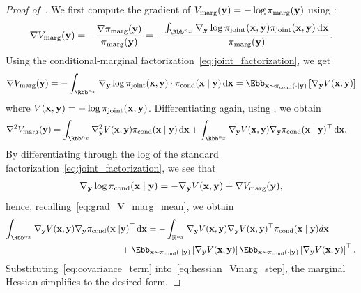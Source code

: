 \documentclass[onefignum,onetabnum]{siamonline250211}
\renewcommand{\d} {{\rm d}}                                %
\newcommand{\bfx}{{\bf x}}
\newcommand{\bfy}{{\bf y}}
\newcommand{\bbR}{\mathbb{R}}
\newcommand{\nx}{{n_{x}}}
\newcommand{\pjoint}{\pi_{\rm joint}}
\newcommand{\pcond}{\pi_{\rm cond}}
\newcommand{\pmarg}{\pi_{\rm marg}}
\begin{document}
\begin{proof}[Proof of~]
	We first compute the gradient of $V_{\rm marg}(\bfy) = -\log \pmarg(\bfy)$ using :
		\begin{align}
			\begin{split}
			\nabla V_{\rm marg}(\bfy)
				=-\frac{\nabla \pmarg(\bfy)}{\pmarg(\bfy)}
				= -\frac{\int_{\Rbb^\nx}  \nabla_{\bfy}\log \pjoint(\bfx, \bfy) \pjoint(\bfx, \bfy)\,\d\bfx}{\pmarg(\bfy)}.
			\end{split}
		\end{align}
		Using the conditional-marginal factorization~\eqref{eq:joint_factorization}, we get
		\begin{align}\label{eq:grad_V_marg_mean}
			\nabla V_{\rm marg}(\bfy)
				= -\int_{\Rbb^\nx}  \nabla_{\bfy}\log \pjoint(\bfx, \bfy) \cdot \pcond(\bfx \mid \bfy) \,\d\bfx
				= \Ebb_{\bfx\sim \pcond(\cdot \mid \bfy)}\left[ \nabla_{\bfy}V(\bfx, \bfy) \right]
		\end{align}
	where $V(\bfx, \bfy) = -\log \pjoint(\bfx, \bfy)$.
	Differentiating again, using , we obtain
		\begin{align}\label{eq:hessian_Vmarg_step}
		\nabla^2 V_{\rm marg}(\bfy)
				&= \int_{\Rbb^\nx}  \nabla_{\bfy}^2 V(\bfx, \bfy) \pcond(\bfx \mid \bfy) \,\d\bfx +  \int_{\Rbb^\nx}  \nabla_{\bfy} V(\bfx, \bfy) \nabla_{\bfy}\pcond(\bfx \mid \bfy)^\top \,\d\bfx.
		\end{align}
	By differentiating through the log of the standard factorization~\eqref{eq:joint_factorization}, we see that
		\begin{align*}%
		\nabla_{\bfy} \log\pcond(\bfx \mid \bfy) = -\nabla_{\bfy} V(\bfx, \bfy) + \nabla V_{\rm marg}(\bfy),
		\end{align*}
	hence, recalling~\eqref{eq:grad_V_marg_mean}, we obtain
    \begin{equation}
    \label{eq:covariance_term}
    \begin{split}
        \int_{\Rbb^\nx} \nabla_{\bfy} V(\bfx, \bfy) \nabla_{\bfy}\pcond(\bfx \mid &\bfy)^\top\,\d\bfx=-\int_{\bbR^\nx}\nabla_\bfy V(\bfx,\bfy)\nabla_\bfy V(\bfx,\bfy)^\top \pcond(\bfx\mid\bfy)d\bfx\\
        &
        + \Ebb_{\bfx\sim \pcond(\cdot \mid \bfy)}\left[ \nabla_{\bfy}V(\bfx, \bfy) \right]\Ebb_{\bfx\sim \pcond(\cdot \mid \bfy)}\left[ \nabla_{\bfy}V(\bfx, \bfy) \right]^\top.
        \end{split}
    \end{equation}
    Substituting~\eqref{eq:covariance_term} into~\eqref{eq:hessian_Vmarg_step},  the marginal Hessian simplifies to the desired form.
\end{proof}
%
%
\end{document}
